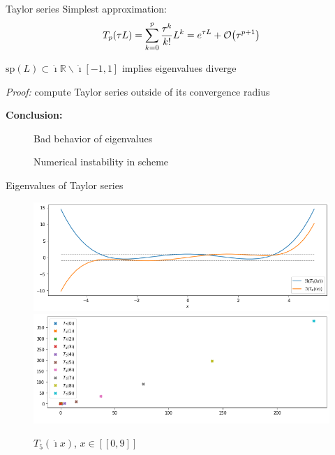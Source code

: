 \documentclass{beamer}
\newcommand{\xmark}{{\color{mred}\ding{55}}}
\newcommand{\mbold}[1]{{\textbf{\color{PLB}#1}}}
\newcommand{\I}{\dot{\imath}}
\begin{document}
\begin{frame}{Taylor series}
  Simplest approximation:
  $$
    T_p(\tau L) = \sum_{k=0}^p \frac{\tau^k}{k!}L^k = e^{\tau L} + \order{\tau^{p+1}}
  $$

  \begin{theorem}
    $\text{sp}(L)\subset\I\mathbb{R}\smallsetminus\I[-1,1]$ implies eigenvalues diverge
  \end{theorem}
  \emph{Proof:} compute Taylor series outside of its convergence radius

  \mbold{Conclusion:}
  \begin{description}
    \item[\xmark] Bad behavior of eigenvalues
    \item[\xmark] Numerical instability in scheme
  \end{description}
\end{frame}
\begin{frame}{Eigenvalues of Taylor series}
   \begin{figure}\centering
    \includegraphics[height=0.35\textheight]{img/T5_reim}
    \includegraphics[height=0.35\textheight]{img/T5_ev}
    \caption{$T_5(\I x)$, $x\in[\![0,9]\!]$}
  \end{figure}
\end{frame}
\end{document}
